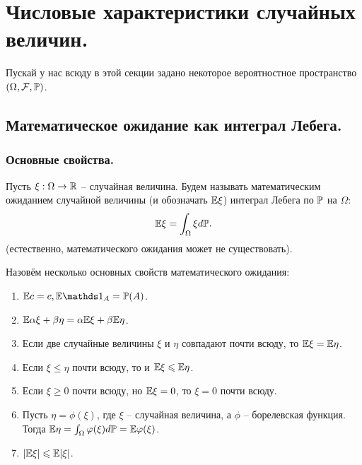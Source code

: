 \section{Числовые характеристики случайных величин.}
Пускай у нас всюду в этой секции задано некоторое вероятностное пространство $(\Omega, \mathcal{F}, \P)$.
\subsection{Математическое ожидание как интеграл Лебега.}
\subsubsection{Основные свойства.}
\begin{definition}
    Пусть $\xi: \Omega \to \R$ -- случайная величина.
    Будем называть математическим ожиданием случайной величины (и обозначать $\Ex \xi$) интеграл Лебега по $\P$ на $\Omega$:
    \[
        \Ex \xi = \int_{\Omega} \xi d\P.
    \]
    (естественно, математического ожидания может не существовать).
\end{definition}
Назовём несколько основных свойств математического ожидания:
\begin{enumerate}
    \item $\Ex c = c, \Ex{\Ind_A} = \P(A)$.
    \item $\Ex \alpha \xi + \beta \eta = \alpha \Ex \xi + \beta \Ex \eta$.
    \item Если две случайные величины $\xi$ и $\eta$ совпадают почти всюду, то $\Ex \xi = \Ex \eta$.
    \item Если $\xi \leq \eta$ почти всюду, то и $\Ex \xi \leq \Ex \eta$.
    \item Если $\xi \geq 0$ почти всюду, но $\Ex \xi = 0$, то $\xi = 0$ почти всюду.
    \item Пусть $\eta = \phi(\xi)$, где $\xi$ -- случайная величина, а $\phi$ -- борелевская функция.
    Тогда $\Ex \eta = \int_{\Omega} \phi(\xi)d\P = \Ex \phi(\xi)$.
    \item $|\Ex \xi| \leq \Ex |\xi|$.
\end{enumerate}
